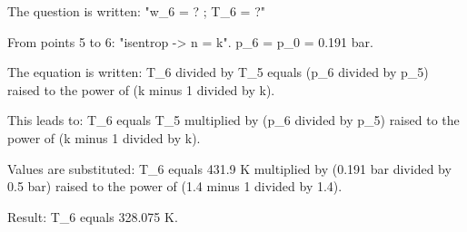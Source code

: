 The question is written: "w_6 = ? ; T_6 = ?"  

From points 5 to 6: "isentrop -> n = k".  
p_6 = p_0 = 0.191 bar.  

The equation is written:  
T_6 divided by T_5 equals (p_6 divided by p_5) raised to the power of (k minus 1 divided by k).  

This leads to:  
T_6 equals T_5 multiplied by (p_6 divided by p_5) raised to the power of (k minus 1 divided by k).  

Values are substituted:  
T_6 equals 431.9 K multiplied by (0.191 bar divided by 0.5 bar) raised to the power of (1.4 minus 1 divided by 1.4).  

Result:  
T_6 equals 328.075 K.
